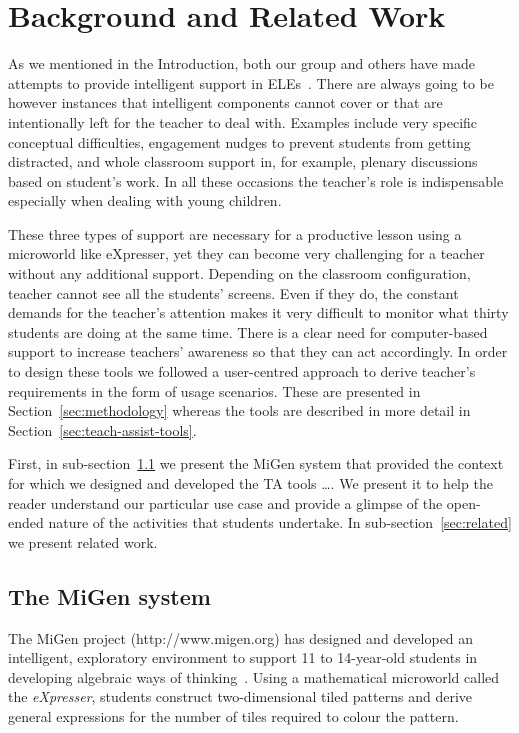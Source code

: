 
\section{Background and Related Work}
\label{sec:backgr-relat-work}

As we mentioned in the Introduction, both our group and others have
made attempts to provide intelligent support in
ELEs~\cite{MiGen-JPRIT,veermans03,AmersiConati09}. There are always
going to be however instances that intelligent components cannot 
cover or that are intentionally left for the teacher to deal
with. Examples include very specific conceptual difficulties, 
engagement nudges to prevent students from getting distracted, 
and whole classroom support in, for example, plenary discussions based 
on student's work. In all these occasions the teacher's role is
 indispensable especially when dealing with young children. 

These three types of support are necessary for a productive lesson
using a microworld like eXpresser, yet they can become very
challenging for a teacher without any additional support. Depending on
the classroom configuration, teacher cannot see all the students'
screens. Even if they do, the constant demands for the teacher's attention
makes it very difficult to monitor what thirty students are doing at
the same time. There is a clear need for computer-based support to
increase teachers' awareness so that they can act accordingly. In
order to design these tools we followed a user-centred approach to
derive teacher's requirements in the form of usage scenarios. These
are presented in Section~\ref{sec:methodology} whereas the tools are
described in more detail in Section~\ref{sec:teach-assist-tools}. 

First, in sub-section~\ref{sec:migen-system} we present the MiGen
system that provided the context for which we designed and developed 
the TA tools \dots. We present it to help the reader understand our
 particular use case and provide a glimpse of the open-ended nature 
of the activities that students undertake.  In sub-section~\ref{sec:related}
we present related work.

\subsection{The MiGen system}
\label{sec:migen-system}

The MiGen project (http://www.migen.org) has designed and developed an
intelligent, exploratory environment to support 11 to 14-year-old
students in developing algebraic ways of
thinking~\cite{Manolis2012Sowing}.
 Using a mathematical microworld called the {\em eXpresser}, students construct
two-dimensional tiled patterns and derive general expressions for the number
of tiles required to colour the pattern. 

